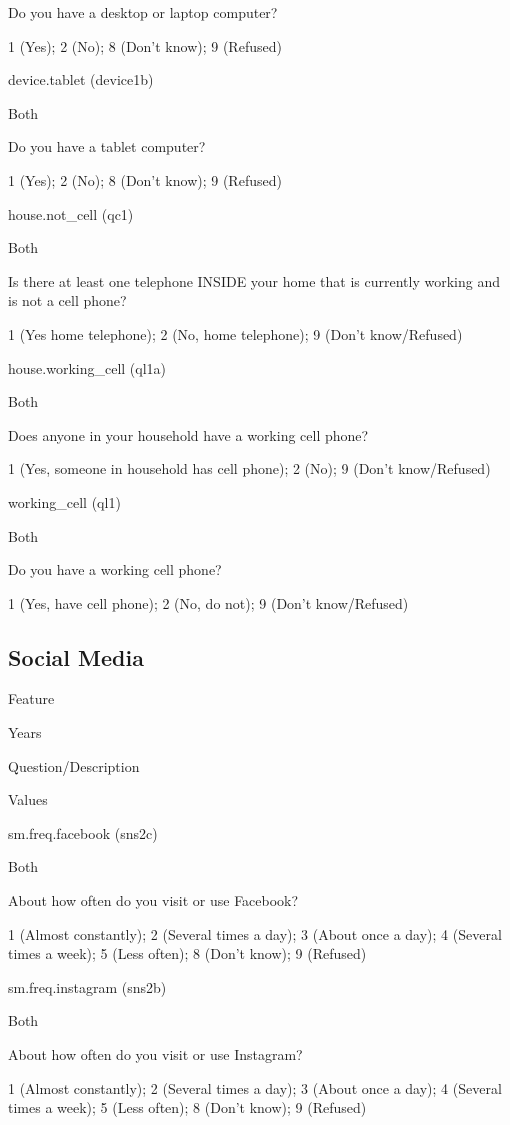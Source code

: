 \documentclass[]{book}
\begin{document}
Do you have a desktop or laptop computer?

1 (Yes); 2 (No); 8 (Don't know); 9 (Refused)

device.tablet (device1b)

Both

Do you have a tablet computer?

1 (Yes); 2 (No); 8 (Don't know); 9 (Refused)

house.not\_cell (qc1)

Both

Is there at least one telephone INSIDE your home that is currently
working and is not a cell phone?

1 (Yes home telephone); 2 (No, home telephone); 9 (Don't know/Refused)

house.working\_cell (ql1a)

Both

Does anyone in your household have a working cell phone?

1 (Yes, someone in household has cell phone); 2 (No); 9 (Don't
know/Refused)

working\_cell (ql1)

Both

Do you have a working cell phone?

1 (Yes, have cell phone); 2 (No, do not); 9 (Don't know/Refused)

\subsection*{Social Media}\label{social-media}

Feature

Years

Question/Description

Values

sm.freq.facebook (sns2c)

Both

About how often do you visit or use Facebook?

1 (Almost constantly); 2 (Several times a day); 3 (About once a day); 4
(Several times a week); 5 (Less often); 8 (Don't know); 9 (Refused)

sm.freq.instagram (sns2b)

Both

About how often do you visit or use Instagram?

1 (Almost constantly); 2 (Several times a day); 3 (About once a day); 4
(Several times a week); 5 (Less often); 8 (Don't know); 9 (Refused)
\end{document}
